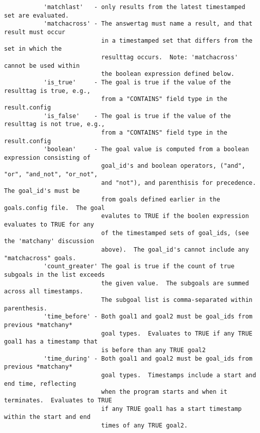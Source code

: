 \documentclass{article}
\begin{document}
\begin{verbatim}
           'matchlast'   - only results from the latest timestamped set are evaluated.
           'matchacross' - The answertag must name a result, and that result must occur
                           in a timestamped set that differs from the set in which the 
                           resulttag occurs.  Note: 'matchacross' cannot be used within 
                           the boolean expression defined below.
           'is_true'     - The goal is true if the value of the resulttag is true, e.g., 
                           from a "CONTAINS" field type in the result.config
           'is_false'    - The goal is true if the value of the resulttag is not true, e.g., 
                           from a "CONTAINS" field type in the result.config
           'boolean'     - The goal value is computed from a boolean expression consisting of 
                           goal_id's and boolean operators, ("and", "or", "and_not", "or_not", 
                           and "not"), and parenthisis for precedence.  The goal_id's must be 
                           from goals defined earlier in the goals.config file.  The goal 
                           evalutes to TRUE if the boolen expression evaluates to TRUE for any
                           of the timestamped sets of goal_ids, (see the 'matchany' discussion 
                           above).  The goal_id's cannot include any "matchacross" goals.
           'count_greater' The goal is true if the count of true subgoals in the list exceeds 
                           the given value.  The subgoals are summed across all timestamps.  
                           The subgoal list is comma-separated within parenthesis.
           'time_before' - Both goal1 and goal2 must be goal_ids from previous *matchany* 
                           goal types.  Evaluates to TRUE if any TRUE goal1 has a timestamp that 
                           is before than any TRUE goal2
           'time_during' - Both goal1 and goal2 must be goal_ids from previous *matchany* 
                           goal types.  Timestamps include a start and end time, reflecting 
                           when the program starts and when it terminates.  Evaluates to TRUE 
                           if any TRUE goal1 has a start timestamp within the start and end 
                           times of any TRUE goal2.
 

\end{verbatim}
\end{document}
